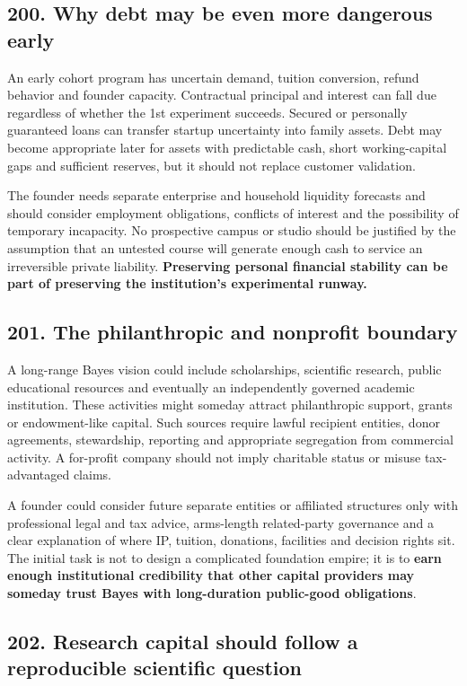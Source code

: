 \subsection{200. Why debt may be even more dangerous early}


An early cohort program has uncertain demand, tuition conversion, refund behavior and founder capacity. Contractual principal and interest can fall due regardless of whether the 1st experiment succeeds. Secured or personally guaranteed loans can transfer startup uncertainty into family assets. Debt may become appropriate later for assets with predictable cash, short working-capital gaps and sufficient reserves, but it should not replace customer validation.

The founder needs separate enterprise and household liquidity forecasts and should consider employment obligations, conflicts of interest and the possibility of temporary incapacity. No prospective campus or studio should be justified by the assumption that an untested course will generate enough cash to service an irreversible private liability. \textbf{Preserving personal financial stability can be part of preserving the institution's experimental runway.}

\subsection{201. The philanthropic and nonprofit boundary}


A long-range Bayes vision could include scholarships, scientific research, public educational resources and eventually an independently governed academic institution. These activities might someday attract philanthropic support, grants or endowment-like capital. Such sources require lawful recipient entities, donor agreements, stewardship, reporting and appropriate segregation from commercial activity. A for-profit company should not imply charitable status or misuse tax-advantaged claims.

A founder could consider future separate entities or affiliated structures only with professional legal and tax advice, arms-length related-party governance and a clear explanation of where IP, tuition, donations, facilities and decision rights sit. The initial task is not to design a complicated foundation empire; it is to \textbf{earn enough institutional credibility that other capital providers may someday trust Bayes with long-duration public-good obligations}.

\subsection{202. Research capital should follow a reproducible scientific question}


